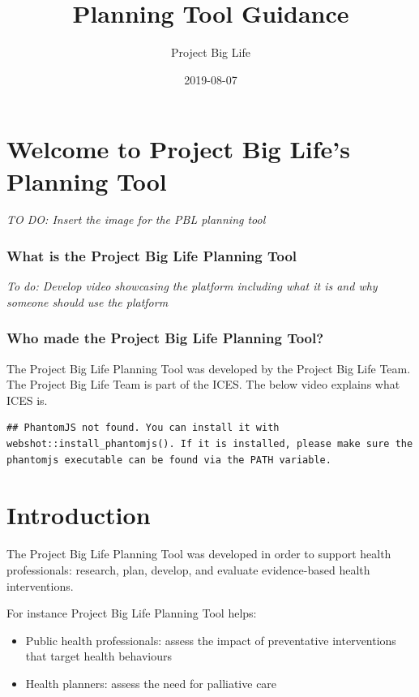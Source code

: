 \documentclass[]{book}
\title{Planning Tool Guidance}
\author{Project Big Life}
\date{2019-08-07}
\providecommand{\tightlist}{%
  \setlength{\itemsep}{0pt}\setlength{\parskip}{0pt}}
\begin{document}
\maketitle

{
\setcounter{tocdepth}{1}
\tableofcontents
}
\chapter{Welcome to Project Big Life's Planning
Tool}\label{welcome-to-project-big-lifes-planning-tool}

\emph{TO DO: Insert the image for the PBL planning tool}

\subsection{What is the Project Big Life Planning
Tool}\label{what-is-the-project-big-life-planning-tool}

\emph{To do: Develop video showcasing the platform including what it is
and why someone should use the platform}

\subsection{Who made the Project Big Life Planning
Tool?}\label{who-made-the-project-big-life-planning-tool}

The Project Big Life Planning Tool was developed by the Project Big Life
Team. The Project Big Life Team is part of the ICES. The below video
explains what ICES is.

\begin{verbatim}
## PhantomJS not found. You can install it with webshot::install_phantomjs(). If it is installed, please make sure the phantomjs executable can be found via the PATH variable.
\end{verbatim}

\chapter{Introduction}\label{introduction}

The Project Big Life Planning Tool was developed in order to support
health professionals: research, plan, develop, and evaluate
evidence-based health interventions.

For instance Project Big Life Planning Tool helps:

\begin{itemize}
\tightlist
\item
  Public health professionals: assess the impact of preventative
  interventions that target health behaviours
\item
  Health planners: assess the need for palliative care
\end{itemize}
\end{document}
